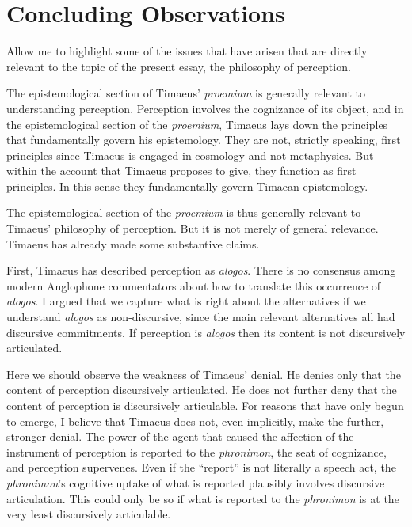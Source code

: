 
\section{Concluding Observations} %
\label{sec:concluding_observations}

Allow me to highlight some of the issues that have arisen that are directly relevant to the topic of the present essay, the philosophy of perception.

The epistemological section of Timaeus' \emph{proemium} is generally relevant to understanding perception. Perception involves the cognizance of its object, and in the epistemological section of the \emph{proemium}, Timaeus lays down the principles that fundamentally govern his epistemology. They are not, strictly speaking, first principles since Timaeus is engaged in cosmology and not metaphysics. But within the account that Timaeus proposes to give, they function as first principles. In this sense they fundamentally govern Timaean epistemology.

The epistemological section of the \emph{proemium} is thus generally relevant to Timaeus' philosophy of perception. But it is not merely of general relevance. Timaeus has already made some substantive claims.

First, Timaeus has described perception as \emph{alogos}. There is no consensus among modern Anglophone commentators about how to translate this occurrence of \emph{alogos}. I argued that we capture what is right about the alternatives if we understand \emph{alogos} as non-discursive, since the main relevant alternatives all had discursive commitments. If perception is \emph{alogos} then its content is not discursively articulated. 

Here we should observe the weakness of Timaeus' denial. He denies only that the content of perception discursively articulated. He does not further deny that the content of perception is discursively articulable. For reasons that have only begun to emerge, I believe that Timaeus does not, even implicitly, make the further, stronger denial. The power of the agent that caused the affection of the instrument of perception is reported to the \emph{phronimon}, the seat of cognizance, and perception supervenes. Even if the ``report'' is not literally a speech act, the \emph{phronimon}'s cognitive uptake of what is reported plausibly involves discursive articulation. This could only be so if what is reported to the \emph{phronimon} is at the very least discursively articulable.


